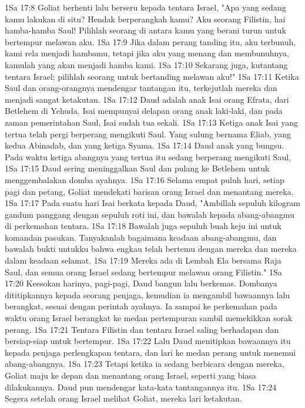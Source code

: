 1Sa 17:8  Goliat berhenti lalu berseru kepada tentara Israel, "Apa yang sedang kamu lakukan di situ? Hendak berperangkah kamu? Aku seorang Filistin, hai hamba-hamba Saul! Pilihlah seorang di antara kamu yang berani turun untuk bertempur melawan aku.
1Sa 17:9  Jika dalam perang tanding itu, aku terbunuh, kami rela menjadi hambamu, tetapi jika aku yang menang dan membunuhnya, kamulah yang akan menjadi hamba kami.
1Sa 17:10  Sekarang juga, kutantang tentara Israel; pilihlah seorang untuk bertanding melawan aku!"
1Sa 17:11  Ketika Saul dan orang-orangnya mendengar tantangan itu, terkejutlah mereka dan menjadi sangat ketakutan.
1Sa 17:12  Daud adalah anak Isai orang Efrata, dari Betlehem di Yehuda. Isai mempunyai delapan orang anak laki-laki, dan pada zaman pemerintahan Saul, Isai sudah tua sekali.
1Sa 17:13  Ketiga anak Isai yang tertua telah pergi berperang mengikuti Saul. Yang sulung bernama Eliab, yang kedua Abinadab, dan yang ketiga Syama.
1Sa 17:14  Daud anak yang bungsu. Pada waktu ketiga abangnya yang tertua itu sedang berperang mengikuti Saul,
1Sa 17:15  Daud sering meninggalkan Saul dan pulang ke Betlehem untuk menggembalakan domba ayahnya.
1Sa 17:16  Selama empat puluh hari, setiap pagi dan petang, Goliat mendekati barisan orang Israel dan menantang mereka.
1Sa 17:17  Pada suatu hari Isai berkata kepada Daud, "Ambillah sepuluh kilogram gandum panggang dengan sepuluh roti ini, dan bawalah kepada abang-abangmu di perkemahan tentara.
1Sa 17:18  Bawalah juga sepuluh buah keju ini untuk komandan pasukan. Tanyakanlah bagaimana keadaan abang-abangmu, dan bawalah bukti untukku bahwa engkau telah bertemu dengan mereka dan mereka dalam keadaan selamat.
1Sa 17:19  Mereka ada di Lembah Ela bersama Raja Saul, dan semua orang Israel sedang bertempur melawan orang Filistin."
1Sa 17:20  Keesokan harinya, pagi-pagi, Daud bangun lalu berkemas. Dombanya dititipkannya kepada seorang penjaga, kemudian ia mengambil bawaannya lalu berangkat, sesuai dengan perintah ayahnya. Ia sampai ke perkemahan pada waktu orang Israel berangkat ke medan pertempuran sambil memekikkan sorak perang.
1Sa 17:21  Tentara Filistin dan tentara Israel saling berhadapan dan bersiap-siap untuk bertempur.
1Sa 17:22  Lalu Daud menitipkan bawaannya itu kepada penjaga perlengkapan tentara, dan lari ke medan perang untuk menemui abang-abangnya.
1Sa 17:23  Tetapi ketika ia sedang berbicara dengan mereka, Goliat maju ke depan dan menantang orang Israel, seperti yang biasa dilakukannya. Daud pun mendengar kata-kata tantangannya itu.
1Sa 17:24  Segera setelah orang Israel melihat Goliat, mereka lari ketakutan.
